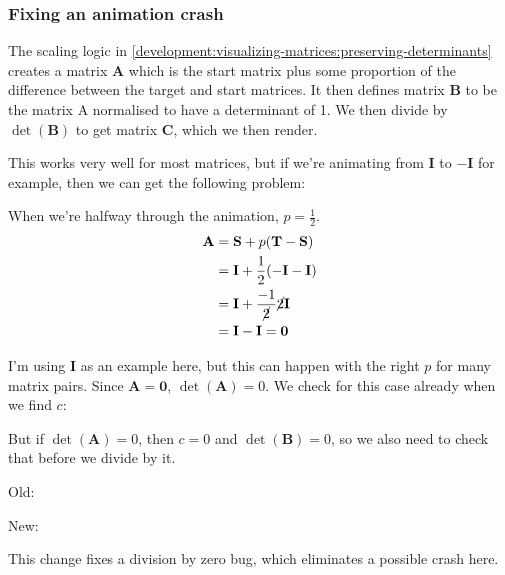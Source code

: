 \documentclass[../development.tex]{subfiles}
\begin{document}
\subsubsection{Fixing an animation crash\label{development:fixing-bugs-and-adding-polish:fixing-an-animation-crash}}

The scaling logic in \ref{development:visualizing-matrices:preserving-determinants} creates a matrix $\mathbf{A}$ which is the start matrix plus some proportion of the difference between the target and start matrices. It then defines matrix $\mathbf{B}$ to be the matrix A normalised to have a determinant of 1. We then divide by $\det(\mathbf{B})$ to get matrix $\mathbf{C}$, which we then render.

This works very well for most matrices, but if we're animating from $\mathbf{I}$ to $-\mathbf{I}$ for example, then we can get the following problem:

When we're halfway through the animation, $p = \frac{1}{2}$.
\begin{align*}
\mathbf{A} &= \mathbf{S} + p (\mathbf{T} - \mathbf{S})\\
&= \mathbf{I} + \frac{1}{2} (-\mathbf{I} - \mathbf{I})\\
&= \mathbf{I} + \frac{-1}{\cancel{2}} \cancel{2} \mathbf{I}\\
&= \mathbf{I} - \mathbf{I} = \mathbf{0}
\end{align*}

I'm using $\mathbf{I}$ as an example here, but this can happen with the right $p$ for many matrix pairs. Since $\mathbf{A} = \mathbf{0}$, $\det(\mathbf{A}) = 0$. We check for this case already when we find $c$:


But if $\det(\mathbf{A}) = 0$, then $c = 0$ and $\det(\mathbf{B}) = 0$, so we also need to check that before we divide by it.

Old:


New:


This change fixes a division by zero bug, which eliminates a possible crash here.
\end{document}
